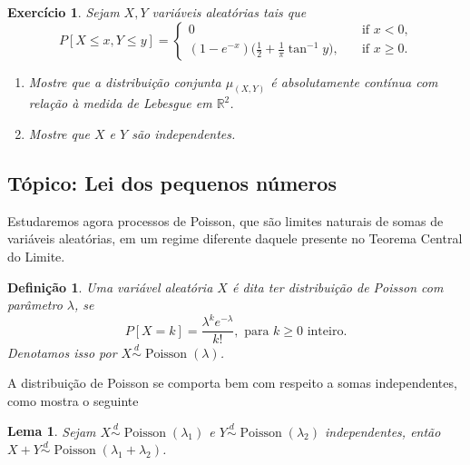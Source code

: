 \documentclass[reqno, draft]{book}
\newcommand*\1{\mathds{1}}
\newtheorem{lemma}[theorem]{Lema}
\newtheorem{definition}[theorem]{Definição}
\newtheorem{exercise}[example]{Exercício}
\DeclareMathOperator{\Poisson}{Poisson}
\begin{document}
\begin{exercise}
  Sejam $X, Y$ vari\'aveis aleat\'orias tais que
  \begin{equation}
    P[X \leq x, Y \leq y] =
    \begin{cases}
      0 & \quad \text{if $x < 0$,}\\
      (1-e^{-x}) \Big(\frac 12 + \frac 1\pi \tan^{-1} y \Big), & \quad \text{if $x \geq 0$}.
    \end{cases}
  \end{equation}
  \begin{enumerate}[\quad a)]
  \item Mostre que a distribui\c{c}\~ao conjunta $\mu_{(X,Y)}$ \'e
    absolutamente cont\'inua com rela\c{c}\~ao \`a medida de Lebesgue em
    $\mathbb{R}^2$.
  \item Mostre que $X$ e $Y$ s\~ao independentes.
  \end{enumerate}
\end{exercise}

\subsection{Tópico: Lei dos pequenos números}


Estudaremos agora processos de Poisson, que são limites naturais de somas de variáveis aleatórias, em um regime diferente daquele presente no Teorema Central do Limite.

\begin{definition}
  Uma variável aleatória $X$ é dita ter distribuição de Poisson  com parâmetro $\lambda$, se
  \begin{equation}
    P[X = k] = \frac{\lambda^k e^{-\lambda}}{k!}, \text{ para $k \geq 0$ inteiro.}
  \end{equation}
  Denotamos isso por $X \overset{d}\sim \Poisson(\lambda)$.
\end{definition}

A distribuição de Poisson se comporta bem com respeito a somas independentes, como mostra o seguinte
\begin{lemma}
\label{l:soma_poisson}
Sejam $X \overset{d}\sim \Poisson(\lambda_1)$ e $Y \overset{d}\sim \Poisson(\lambda_2)$ independentes, então $X+Y \overset{d}\sim \Poisson(\lambda_1 + \lambda_2)$.
\end{lemma}
\end{document}

